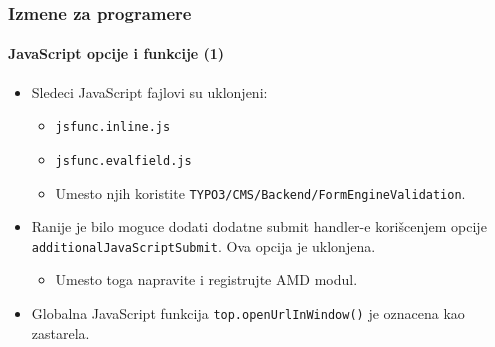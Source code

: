 
\begin{frame}[fragile]
	\frametitle{Izmene za programere}
	\framesubtitle{JavaScript opcije i funkcije (1)}

	\begin{itemize}
		\item Sledeci JavaScript fajlovi su uklonjeni:

			\begin{itemize}
				\item \texttt{jsfunc.inline.js}
				\item \texttt{jsfunc.evalfield.js}
			\end{itemize}

			\begin{itemize}\smaller
				\item[\ding{228}] Umesto njih koristite \texttt{TYPO3/CMS/Backend/FormEngineValidation}.
			\end{itemize}\normalsize

		\item Ranije je bilo moguce dodati dodatne submit handler-e korišcenjem opcije \texttt{additionalJavaScriptSubmit}.
			Ova opcija je uklonjena.

			\begin{itemize}\smaller
				\item[\ding{228}] Umesto toga napravite i registrujte AMD modul.
			\end{itemize}\normalsize

		\item Globalna JavaScript funkcija \texttt{top.openUrlInWindow()} je oznacena kao zastarela.

	\end{itemize}

\end{frame}


